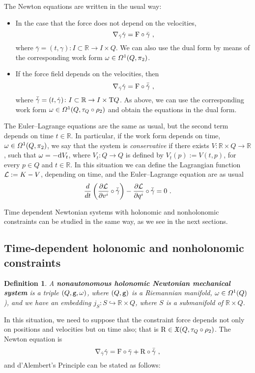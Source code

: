 \documentclass[12pt]{report}
\newtheorem{definition}[teor]{Definition}
\def\bit{\begin{itemize}}
\def\eit{\end{itemize}}
\def\derpar#1#2{\frac{\partial{#1}}{\partial{#2}}}
\def\vf{\mathfrak X}
\def\df{{\mit\Omega}}
\def\Lag{{\cal L}}
\def\d{{\rm d}}
\def\Real{\mathbb{R}}
\def\Tan{{\rm T}}
\begin{document}
The Newton equations are written in the usual way:
\bit
\item
In the case that the force does not depend on the velocities,
$$
\nabla_{\dot\gamma}\dot\gamma ={\rm F}\circ\bar\gamma \ ,
$$
where $\bar\gamma=(t,\gamma)\colon I\subset\Real\to I\times Q$.
We can also use the dual form by means of the corresponding work form $\omega\in\df^1(Q,\pi_2)$.
\item
If the force field depends on the velocities, then
$$
\nabla_{\dot\gamma}\dot\gamma ={\rm F}\circ\bar{\dot\gamma} \ ,
$$
where $\bar{\dot\gamma}=(t,\dot\gamma)\colon I\subset\Real\to I\times\Tan Q$.
As above, we can use the corresponding work form $\omega\in\df^1(Q,\tau_Q\circ\rho_2)$ and obtain the equations in the dual form.
\eit

The  Euler--Lagrange equations are the same as usual, but the second term depends on time $t\in\Real$.
In particular, if the work form depends on time, $\omega\in\df^1(Q,\pi_2)$,
we say that the system is \textsl{conservative} if there exists
$V\colon\Real\times Q\to \Real$, such that $\omega=-\d V_t$,
where $V_t\colon Q\to Q$ is defined by $V_t(p):=V(t,p)$,
for every $p\in Q$ and $t\in\Real$.
In this situation we can define the Lagrangian function $\Lag:=K-V$, depending on time, and the Euler--Lagrange equation are as usual
$$
\frac{d}{d t}\left(\derpar{\Lag}{v^i}\circ\bar{\dot\gamma}\right)-
\derpar{\Lag}{q^i}\circ\bar{\dot\gamma}= 0 \ .
$$

Time dependent Newtonian systems with holonomic and nonholonomic constraints can be studied in the same way, as we see in the next sections.


\subsection{Time-dependent holonomic and nonholonomic constraints}


\begin{definition}
A {\sl \textbf{nonautonomous holonomic Newtonian mechanical system}}
is a triple $(Q,{\tt g},\omega)$, where $(Q,{\tt g})$ is a Riemannian manifold, 
$\omega\in\df^1(Q)$), and we have an embedding 
$j_S\colon S\hookrightarrow \Real\times Q$,  where $S$ is a submanifold of $\Real\times Q$.
\end{definition}

In this situation, we need to suppose that the constraint force depends not only on positions and velocities but on time also; that is ${\rm R}\in\vf (Q,\tau_Q\circ\rho_2)$. The Newton equation is
$$
\nabla_{\dot\gamma}\dot\gamma ={\rm F}\circ\bar\gamma +{\rm R}\circ\bar{\dot\gamma} \ ,
$$
and d'Alembert's Principle can be stated as follows:
\end{document}
